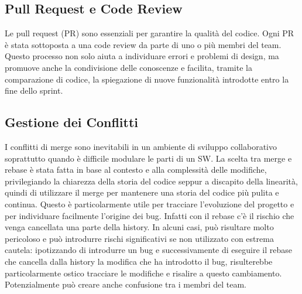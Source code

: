 

\subsection{Pull Request e Code Review}

Le pull request (PR) sono essenziali per garantire la qualità del codice. Ogni PR è stata sottoposta a una code review da parte di uno o più membri del team. 
Questo processo non solo aiuta a individuare errori e problemi di design, ma promuove anche la condivisione delle conoscenze e facilita, tramite la 
comparazione di codice, la spiegazione di nuove funzionalità introdotte entro la fine dello sprint.


\subsection{Gestione dei Conflitti}

I conflitti di merge sono inevitabili in un ambiente di sviluppo collaborativo soprattutto quando è difficile modulare le parti di un SW.
La scelta tra merge e rebase è stata fatta in base al contesto e alla complessità delle modifiche, privilegiando la chiarezza della storia del codice seppur a discapito della linearità, 
quindi di utilizzare il merge per mantenere una storia del codice più pulita e continua.
Questo è particolarmente utile per tracciare
l’evoluzione del progetto e per individuare facilmente l’origine dei bug. 
Infatti con il rebase c'è il rischio che venga cancellata una parte della history. In alcuni casi, può risultare molto pericoloso e 
può introdurre rischi significativi se non utilizzato con estrema cautela:
ipotizzando di introdurre un bug e successivamente di eseguire il rebase che cancella dalla history la modifica che ha introdotto il bug,
risulterebbe particolarmente ostico tracciare le modifiche e risalire a questo cambiamento. Potenzialmente può creare anche confusione tra i membri del team.

